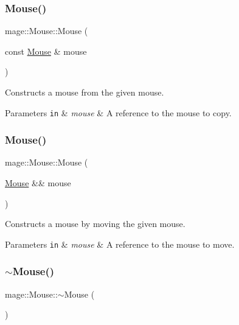 \subsubsection{\texorpdfstring{Mouse()}{Mouse()}\hspace{0.1cm}{\footnotesize\ttfamily [2/3]}}
{\footnotesize\ttfamily mage\+::\+Mouse\+::\+Mouse (\begin{DoxyParamCaption}\item[{const \hyperlink{classmage_1_1_mouse}{Mouse} \&}]{mouse }\end{DoxyParamCaption})\hspace{0.3cm}{\ttfamily [delete]}}

Constructs a mouse from the given mouse.


\begin{DoxyParams}[1]{Parameters}
\mbox{\tt in}  & {\em mouse} & A reference to the mouse to copy. \\
\hline
\end{DoxyParams}
\hypertarget{classmage_1_1_mouse_ad91b06f0a0df67eefc972997169d12c2}{}\label{classmage_1_1_mouse_ad91b06f0a0df67eefc972997169d12c2} 
\subsubsection{\texorpdfstring{Mouse()}{Mouse()}\hspace{0.1cm}{\footnotesize\ttfamily [3/3]}}
{\footnotesize\ttfamily mage\+::\+Mouse\+::\+Mouse (\begin{DoxyParamCaption}\item[{\hyperlink{classmage_1_1_mouse}{Mouse} \&\&}]{mouse }\end{DoxyParamCaption})\hspace{0.3cm}{\ttfamily [default]}}

Constructs a mouse by moving the given mouse.


\begin{DoxyParams}[1]{Parameters}
\mbox{\tt in}  & {\em mouse} & A reference to the mouse to move. \\
\hline
\end{DoxyParams}
\hypertarget{classmage_1_1_mouse_a855f1075ae774c8417d3da7a1e02d580}{}\label{classmage_1_1_mouse_a855f1075ae774c8417d3da7a1e02d580} 
\subsubsection{\texorpdfstring{$\sim$\+Mouse()}{~Mouse()}}
{\footnotesize\ttfamily mage\+::\+Mouse\+::$\sim$\+Mouse (\begin{DoxyParamCaption}{ }\end{DoxyParamCaption})\hspace{0.3cm}{\ttfamily [default]}}


